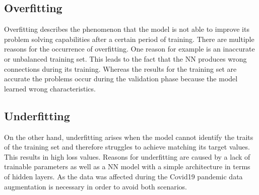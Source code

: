 \subsection{Overfitting}

Overfitting describes the phenomenon that the model is not able to improve its problem solving capabilities after a certain period of training. There are multiple reasons for the occurrence of overfitting. One reason for example is an inaccurate or unbalanced training set. This leads to the fact that the NN produces wrong connections during its training.  Whereas the results for the training set are accurate the problems  occur during the validation phase because the model learned wrong characteristics. \cite{fitting} 
\subsection{Underfitting} 
On the other hand, underfitting arises when the model cannot identify the traits of the training set and therefore struggles to achieve matching its target values. This results in high loss values. Reasons for underfitting are caused by a lack of trainable parameters as well as a NN model with a simple architecture in terms of hidden layers. \cite{fitting} 
\newline
\newline
As the data was affected during the Covid19 pandemic data augmentation is necessary in order to avoid both scenarios.

